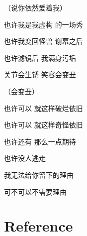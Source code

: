 \documentclass[]{ctexbook}
\begin{document}
（说你依然爱着我）

也许我是我虚构 的一场秀

也许我变回怪兽 谢幕之后

也许滤镜后 我满身污垢

关节会生锈 笑容会变丑

（会变丑）

也许可以 就这样破烂依旧

也许可以 就这样奇怪依旧

也许还有 那么一点期待

也许没人逃走

我无法给你留下的理由

可不可以不需要理由

\chapter*{Reference}\label{reference}




\backmatter
\printindex
\end{document}
